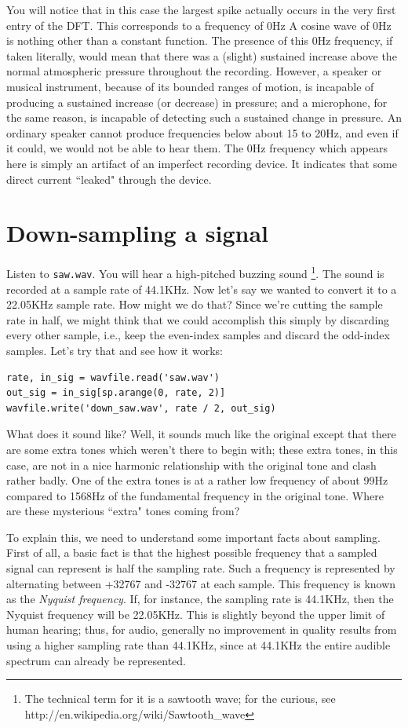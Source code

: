 You will notice that in this case the largest spike actually occurs in the very first entry of the DFT.
This corresponds to a frequency of 0Hz
 A cosine wave of 0Hz is nothing other than a constant function.
 The presence of this 0Hz frequency, if taken literally, would mean that there was a (slight) sustained increase above the normal atmospheric pressure throughout the recording.
 However, a speaker or musical instrument, because of its bounded ranges of motion, is incapable of producing a sustained increase (or decrease) in pressure; and a microphone, for the same reason, is incapable of detecting such a sustained change in pressure.
 An ordinary speaker cannot produce frequencies below about 15 to 20Hz, and even if it could, we would not be able to hear them.
 The 0Hz frequency which appears here is simply an artifact of an imperfect recording device.
 It indicates that some direct current ``leaked" through the device.



\section*{Down-sampling a signal}

Listen to \texttt{saw.wav}.
You will hear a high-pitched buzzing sound \footnote{The technical term for it is a sawtooth wave; for the curious, see http://en.wikipedia.org/wiki/Sawtooth\_wave}.
The sound is recorded at a sample rate of 44.1KHz.
Now let's say we wanted to convert it to a 22.05KHz sample rate. How might we do that?
Since we're cutting the sample rate in half, we might think that we could accomplish this simply by discarding every other sample, i.e., keep the even-index samples and discard the odd-index samples.
Let's try that and see how it works:
\begin{lstlisting}
rate, in_sig = wavfile.read('saw.wav')
out_sig = in_sig[sp.arange(0, rate, 2)]
wavfile.write('down_saw.wav', rate / 2, out_sig)
\end{lstlisting}
What does it sound like?
Well, it sounds much like the original except that there are some extra tones which weren't there to begin with; these extra tones, in this case, are not in a nice harmonic relationship with the original tone and clash rather badly.
One of the extra tones is at a rather low frequency of about 99Hz compared to 1568Hz of the fundamental frequency in the original tone.
Where are these mysterious ``extra" tones coming from?

To explain this, we need to understand some important facts about sampling.
First of all, a basic fact is that the highest possible frequency that a sampled signal can represent is half the sampling rate.
Such a frequency is represented by alternating between +32767 and -32767 at each sample.
This frequency is known as the \emph{Nyquist frequency}.
If, for instance, the sampling rate is 44.1KHz, then the Nyquist frequency will be 22.05KHz.
This is slightly beyond the upper limit of human hearing; thus, for audio, generally no improvement in quality results from using a higher sampling rate than 44.1KHz, since at 44.1KHz the entire audible spectrum can already be represented.

